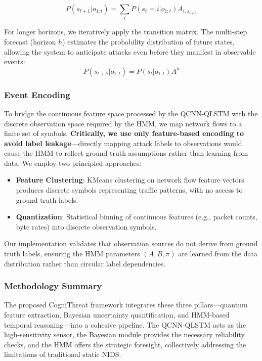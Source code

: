 \documentclass[conference]{IEEEtran}
\begin{document}
\begin{equation}
P(s_{t+1} | o_{1:t}) = \sum_i P(s_t=i | o_{1:t}) A_{i,s_{t+1}}
\end{equation}

For longer horizons, we iteratively apply the transition matrix. The multi-step forecast (horizon $h$) estimates the probability distribution of future states, allowing the system to anticipate attacks even before they manifest in observable events:
\begin{equation}
P(s_{t+h} | o_{1:t}) = P(s_t | o_{1:t}) A^h
\end{equation}

\subsubsection{Event Encoding}
To bridge the continuous feature space processed by the QCNN-QLSTM with the discrete observation space required by the HMM, we map network flows to a finite set of symbols. \textbf{Critically, we use only feature-based encoding to avoid label leakage}—directly mapping attack labels to observations would cause the HMM to reflect ground truth assumptions rather than learning from data. We employ two principled approaches:
\begin{itemize}
    \item \textbf{Feature Clustering}: KMeans clustering on network flow feature vectors produces discrete symbols representing traffic patterns, with no access to ground truth labels.
    \item \textbf{Quantization}: Statistical binning of continuous features (e.g., packet counts, byte rates) into discrete observation symbols.
\end{itemize}
Our implementation validates that observation sources do not derive from ground truth labels, ensuring the HMM parameters $(A, B, \pi)$ are learned from the data distribution rather than circular label dependencies.

\subsubsection{Methodology Summary}
The proposed CogniThreat framework integrates these three pillars—quantum feature extraction, Bayesian uncertainty quantification, and HMM-based temporal reasoning—into a cohesive pipeline. The QCNN-QLSTM acts as the high-sensitivity sensor, the Bayesian module provides the necessary reliability checks, and the HMM offers the strategic foresight, collectively addressing the limitations of traditional static NIDS.
\end{document}

